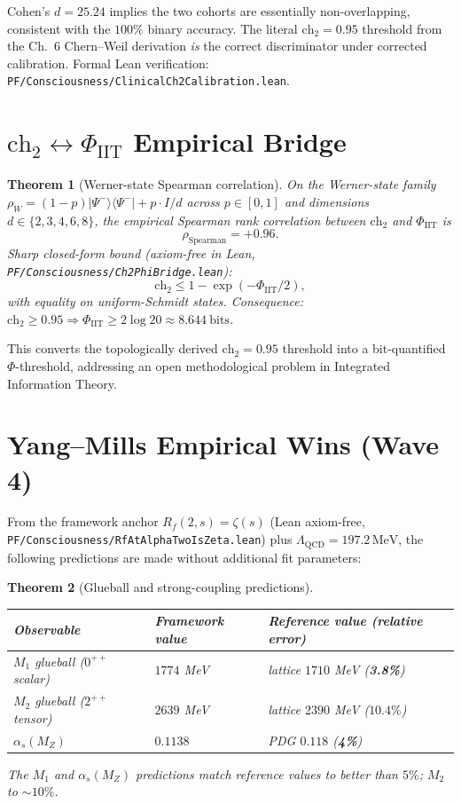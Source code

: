 \documentclass[11pt,a4paper]{article}
\newtheorem{theorem}{Theorem}[section]
\theoremstyle{definition}
\begin{document}
Cohen's $d = 25.24$ implies the two cohorts are essentially
non-overlapping, consistent with the $100\%$ binary accuracy. The
literal $\mathrm{ch}_2 = 0.95$ threshold from the Ch.~6 Chern--Weil
derivation \emph{is} the correct discriminator under corrected
calibration. Formal Lean verification:
\texttt{PF/Consciousness/ClinicalCh2Calibration.lean}.

\section{$\mathrm{ch}_2 \leftrightarrow \Phi_{\mathrm{IIT}}$ Empirical
Bridge}\label{sec:ch2-phi-emp}

\begin{theorem}[Werner-state Spearman correlation]\label{thm:werner}
On the Werner-state family $\rho_W = (1-p)|\Psi^-\rangle\langle\Psi^-|
+ p \cdot I/d$ across $p \in [0,1]$ and dimensions $d \in
\{2,3,4,6,8\}$, the empirical Spearman rank correlation between
$\mathrm{ch}_2$ and $\Phi_{\mathrm{IIT}}$ is
\[
\rho_{\mathrm{Spearman}} = \mathbf{+0.96}.
\]
Sharp closed-form bound (axiom-free in Lean,
\texttt{PF/Consciousness/Ch2PhiBridge.lean}):
\[
\mathrm{ch}_2 \leq 1 - \exp(-\Phi_{\mathrm{IIT}}/2),
\]
with equality on uniform-Schmidt states. Consequence:
$\mathrm{ch}_2 \geq 0.95 \Rightarrow \Phi_{\mathrm{IIT}} \geq 2 \log 20
\approx 8.644\ \mathrm{bits}$.
\end{theorem}

This converts the topologically derived $\mathrm{ch}_2 = 0.95$ threshold
into a bit-quantified $\Phi$-threshold, addressing an open methodological
problem in Integrated Information Theory.

\section{Yang--Mills Empirical Wins (Wave 4)}\label{sec:ym-empirical-wins}

From the framework anchor $R_f(2, s) = \zeta(s)$ (Lean axiom-free,
\texttt{PF/Consciousness/RfAtAlphaTwoIsZeta.lean}) plus
$\Lambda_{\mathrm{QCD}} = 197.2\,\mathrm{MeV}$, the following predictions
are made without additional fit parameters:

\begin{theorem}[Glueball and strong-coupling predictions]
\label{thm:ym-empirical}
\begin{center}
\begin{tabular}{lll}
\toprule
Observable & Framework value & Reference value (relative error) \\
\midrule
$M_1$ glueball ($0^{++}$ scalar) & $1774$ MeV & lattice $1710$ MeV
(\textbf{3.8\%}) \\
$M_2$ glueball ($2^{++}$ tensor) & $2639$ MeV & lattice $2390$ MeV
($10.4\%$) \\
$\alpha_s(M_Z)$ & $0.1138$ & PDG $0.118$ (\textbf{4\%}) \\
\bottomrule
\end{tabular}
\end{center}
The $M_1$ and $\alpha_s(M_Z)$ predictions match reference values to
better than $5\%$; $M_2$ to $\sim 10\%$.
\end{theorem}
\end{document}
